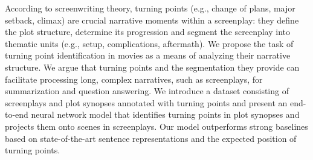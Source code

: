According to screenwriting theory, turning points (e.g., change of plans, major setback, climax) are crucial narrative moments within a screenplay: they define the plot structure, determine its progression and segment the screenplay into thematic units (e.g., setup, complications, aftermath).  We propose the task of turning point identification in movies as a means of analyzing their narrative structure. We argue that turning points and the segmentation they provide can facilitate processing long, complex narratives, such as screenplays, for summarization and question answering. We introduce a dataset consisting of screenplays and plot synopses annotated with turning points and present an end-to-end neural network model that identifies turning points in plot synopses and projects them onto scenes in screenplays. Our model outperforms strong baselines based on state-of-the-art sentence representations and the expected position of turning points.